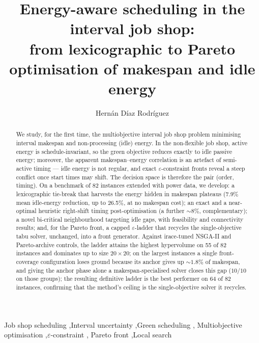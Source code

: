 \documentclass[preprint,12pt]{elsarticle}
\begin{document}
\begin{frontmatter}

\title{Energy-aware scheduling in the interval job shop:\\
from lexicographic to Pareto optimisation of makespan and idle energy}

\author[uniovi]{Hern\'an D\'iaz Rodr\'iguez}
\address[uniovi]{Department of Computer Science, University of Oviedo, Campus
of Gij\'on, 33204 Gij\'on, Spain}

\begin{abstract}
We study, for the first time, the multiobjective interval job shop problem
minimising interval makespan and non-processing (idle) energy. In the
non-flexible job shop, active energy is schedule-invariant, so the green
objective reduces exactly to idle passive energy; moreover, the apparent
makespan--energy correlation is an artefact of semi-active timing --- idle
energy is not regular, and exact $\varepsilon$-constraint fronts reveal a
steep conflict once start times may shift. The decision space is therefore
the pair (order, timing). On a benchmark of 82 instances extended with power
data, we develop: a lexicographic tie-break that harvests the energy hidden
in makespan plateaus (7.9\% mean idle-energy reduction, up to 26.5\%, at no
makespan cost); an exact and a near-optimal heuristic right-shift timing
post-optimisation (a further ${\sim}8\%$, complementary); a novel
bi-critical neighbourhood targeting idle gaps, with feasibility and
connectivity results; and, for the Pareto front, a capped
$\varepsilon$-ladder that recycles the single-objective tabu solver,
unchanged, into a front generator. Against irace-tuned NSGA-II and
Pareto-archive controls, the ladder attains the highest hypervolume on 55 of
82 instances and dominates up to size $20{\times}20$; on the largest instances
a single front-coverage configuration loses ground because its anchor gives
up ${\sim}1.8\%$ of makespan, and giving the anchor phase alone a
makespan-specialised solver closes this gap ($10/10$ on those groups); the
resulting definitive ladder is the best performer on 64 of 82 instances,
confirming that the method's ceiling is the single-objective solver it
recycles.
\end{abstract}

\begin{keyword}
Job shop scheduling \sep Interval uncertainty \sep Green scheduling \sep
Multiobjective optimisation \sep $\varepsilon$-constraint \sep
Pareto front \sep Local search
\end{keyword}

\end{frontmatter}
\end{document}
